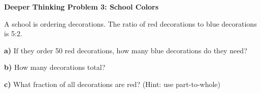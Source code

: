 \documentclass[12pt, letterpaper, fleqn]{article}
\begin{document}
\newpage

\begin{tcolorbox}[colback=yellow!15, colframe=orange, boxrule=1.5pt, arc=4mm, left=6mm, right=6mm, top=5mm, bottom=5mm]

\textbf{Deeper Thinking Problem 3: School Colors}

\medskip

\noindent
A school is ordering decorations. The ratio of red decorations to blue decorations is 5:2.

\noindent
\textbf{a)} If they order 50 red decorations, how many blue decorations do they need?

\vspace{1.8cm}

\noindent
\textbf{b)} How many decorations total?

\vspace{1.8cm}

\noindent
\textbf{c)} What fraction of all decorations are red? (Hint: use part-to-whole)

\vspace{2cm}

\end{tcolorbox}
\end{document}
